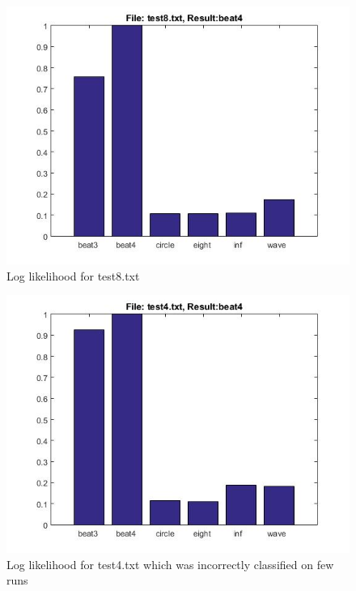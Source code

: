 \documentclass[fleqn,10pt]{SelfArx} %
\begin{document}
\begin{figure}[hbtp]
\centering
\includegraphics[scale=0.45]{test8.jpg}
\caption{Log likelihood for test8.txt}
\label{fig:test8}
\end{figure}

\begin{figure}[hbtp]
\centering
\includegraphics[scale=0.45]{test4err.jpg}
\caption{Log likelihood for test4.txt which was incorrectly classified on few runs}
\label{fig:test4err}
\end{figure}



%
%

\end{document}
